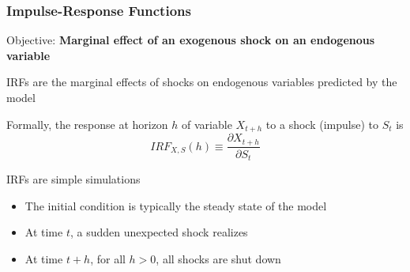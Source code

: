 \documentclass[10pt, aspectratio=1610, handout]{beamer}
\begin{document}
  \begin{frame}
    \frametitle{Impulse-Response Functions}

    Objective: \textbf{Marginal effect of an exogenous shock on an endogenous variable}

    \vfill\pause

    IRFs are the marginal effects of shocks on endogenous variables predicted by the model

    \vfill\pause

    Formally, the response at horizon $h$ of variable $X_{t+h}$ to a shock (impulse) to $S_t$ is
    \begin{equation*}
      IRF_{X,S}(h) \equiv \frac{\partial X_{t+h}}{\partial S_t}
    \end{equation*}

    \vfill\pause

    IRFs are simple simulations
    \begin{itemize}
      \item The initial condition is typically the steady state of the model
      \item At time $t$, a sudden unexpected shock realizes
      \item At time $t+h$, for all $h>0$, all shocks are shut down
    \end{itemize}

  \end{frame}
\end{document}
